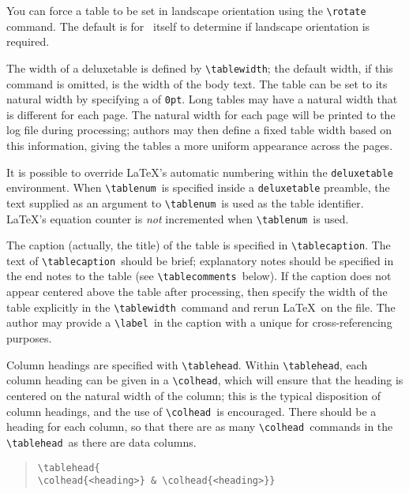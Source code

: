\documentclass[preprint2]{aastex}
\begin{document}
You can force a table to be set in landscape orientation 
using the \verb"\rotate"\ 
\label{cmd-rotate} command. 
The default is for \aastex\ itself to determine if landscape orientation is required. 
 
The width of a deluxetable is defined by \verb"\tablewidth"; 
the default width, if this command is omitted, is the width of the body 
text. 
The table can be set to its natural width by specifying 
a  of \verb"0pt". 
Long tables may have a natural width that is 
different for each page.  The natural width for each page will be 
printed to the log file during processing; 
authors may then define a fixed table width based 
on this information, giving the 
tables a more uniform appearance across the pages. 
 
It is possible to override \LaTeX's automatic numbering within the 
\texttt{deluxetable} environment. 
When \verb"\tablenum"\ 
 is specified inside a \texttt{deluxetable} 
preamble, 
the text supplied as an argument to \verb"\tablenum"\ 
 is used as the 
table identifier. 
\LaTeX's equation counter is \emph{not} incremented when 
\verb"\tablenum"\ 
 is used. 
 
The caption (actually, the title) of the table is specified 
in \verb"\tablecaption". 
The text of \verb"\tablecaption"\ 
 should be brief; 
explanatory notes should be specified in the end notes to the table 
(see \verb"\tablecomments"\ 
 below).  If the caption 
does not appear 
centered above the table after processing, then specify the width of 
the table explicitly in the \verb"\tablewidth"\ 
 command and rerun 
\LaTeX\ on the file.   The author 
may provide a \verb"\label"\ in the caption with a unique  
for cross-referencing 
purposes. 
 
  Column headings are specified with \verb"\tablehead". 
Within \verb"\tablehead", each column heading can be given 
in a \verb"\colhead", which will ensure that the heading 
is centered 
on the natural width of the column; this is the typical disposition 
of column headings, and the use of \verb"\colhead"\ 
 is encouraged. 
There should be a heading for each column, so that there are as 
many \verb"\colhead"\ 
 commands in the \verb"\tablehead"\ 
 as there 
are data columns. 
 
\begin{quote} 
\begin{verbatim} 
\tablehead{ 
\colhead{<heading>} & \colhead{<heading>}} 
\end{verbatim} 
\end{quote} 
 
\end{document}
